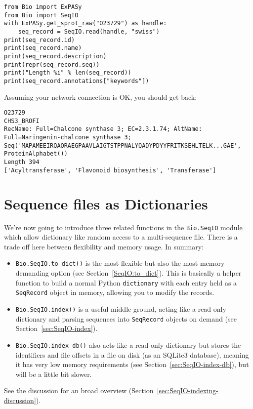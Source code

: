\begin{verbatim}
from Bio import ExPASy
from Bio import SeqIO
with ExPASy.get_sprot_raw("O23729") as handle:
    seq_record = SeqIO.read(handle, "swiss")
print(seq_record.id)
print(seq_record.name)
print(seq_record.description)
print(repr(seq_record.seq))
print("Length %i" % len(seq_record))
print(seq_record.annotations["keywords"])
\end{verbatim}

\noindent Assuming your network connection is OK, you should get back:

\begin{verbatim}
O23729
CHS3_BROFI
RecName: Full=Chalcone synthase 3; EC=2.3.1.74; AltName: Full=Naringenin-chalcone synthase 3;
Seq('MAPAMEEIRQAQRAEGPAAVLAIGTSTPPNALYQADYPDYYFRITKSEHLTELK...GAE', ProteinAlphabet())
Length 394
['Acyltransferase', 'Flavonoid biosynthesis', 'Transferase']
\end{verbatim}

\section{Sequence files as Dictionaries}

We're now going to introduce three related functions in the \verb|Bio.SeqIO|
module which allow dictionary like random access to a multi-sequence file.
There is a trade off here between flexibility and memory usage. In summary:
\begin{itemize}
\item \verb|Bio.SeqIO.to_dict()| is the most flexible but also the most
memory demanding option (see Section~\ref{SeqIO:to_dict}). This is basically
a helper function to build a normal Python \verb|dictionary| with each entry
held as a \verb|SeqRecord| object in memory, allowing you to modify the
records.
\item \verb|Bio.SeqIO.index()| is a useful middle ground, acting like a
read only dictionary and parsing sequences into \verb|SeqRecord| objects
on demand (see Section~\ref{sec:SeqIO-index}).
\item \verb|Bio.SeqIO.index_db()| also acts like a read only dictionary
but stores the identifiers and file offsets in a file on disk (as an
SQLite3 database), meaning it has very low memory requirements (see
Section~\ref{sec:SeqIO-index-db}), but will be a little bit slower.
\end{itemize}
See the discussion for an broad overview
(Section~\ref{sec:SeqIO-indexing-discussion}).

